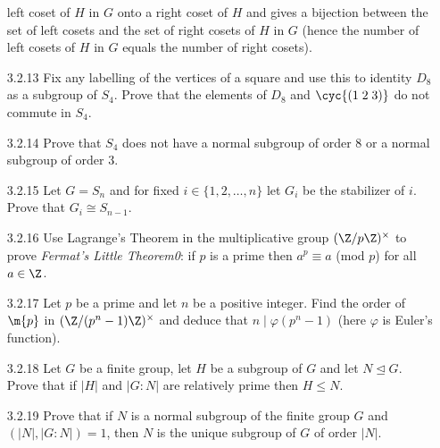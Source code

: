 \begin{enumerate}
                  left coset of $H$ in $G$ onto a right coset of $H$ and gives a
                  bijection between the set of left cosets and the set of right
                  cosets of $H$ in $G$ (hence the number of left cosets of $H$
                  in $G$ equals the number of right cosets).
   \item[3.2.13]  Fix any labelling of the vertices of a square and use this to
                  identity $D_8$ as a subgroup of $S_4$. Prove that the elements
                  of $D_8$ and $\cyc{(1\;2\;3)}$ do not commute in $S_4$.
   \item[3.2.14]  Prove that $S_4$ does not have a normal subgroup of order 8 or
                  a normal subgroup of order 3.
   \item[3.2.15]  Let $G = S_n$ and for fixed $i \in \{1, 2, \ldots, n\}$ let
                  $G_i$ be the stabilizer of $i$. Prove that
                  $G_i \cong S_{n-1}$.
   \item[3.2.16]  Use Lagrange's Theorem in the multiplicative group
                  $(\Z/p\Z)^\times$ to prove \textit{Fermat's Little Theorem0}:
                  if $p$ is a prime then $a^p \equiv a$ (mod $p$) for all
                  $a \in \Z$.
   \item[3.2.17]  Let $p$ be a prime and let $n$ be a positive integer. Find the
                  order of $\m{p}$ in $(\Z/(p^n-1)\Z)^\times$ and deduce that
                  $n \mid \varphi(p^n - 1)$ (here $\varphi$ is Euler's
                  function).
   \item[3.2.18]  Let $G$ be a finite group, let $H$ be a subgroup of $G$ and
                  let $N \trianglelefteq G$. Prove that if $|H|$ and $|G : N|$
                  are relatively prime then $H \le N$.
   \item[3.2.19]  Prove that if $N$ is a normal subgroup of the finite group $G$
                  and $(|N|, |G : N|) = 1$, then $N$ is the unique subgroup of
                  $G$ of order $|N|$.

\end{enumerate}
